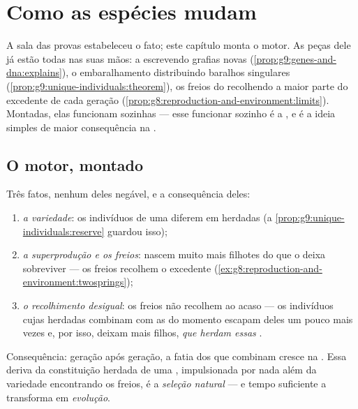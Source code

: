 \chapter{Como as espécies mudam}\label{ch:g9:how-species-change}

A sala das provas estabeleceu o fato; este capítulo monta o
motor. As peças dele já estão todas nas suas mãos: a 
escrevendo grafias novas
(\cref{prop:g9:genes-and-dna:explains}), o embaralhamento
distribuindo baralhos singulares
(\cref{prop:g9:unique-individuals:theorem}), os freios do
 recolhendo a maior parte do excedente de cada
geração
(\cref{prop:g8:reproduction-and-environment:limits}).
Montadas, elas funcionam sozinhas --- esse funcionar sozinho
é a , e é a ideia simples de maior
consequência na .

\section{O motor, montado}

\begin{proposition}\label{prop:g9:how-species-change:selection}
Três fatos, nenhum deles negável, e a consequência deles:
\begin{enumerate}
  \item \emph{a variedade}: os indivíduos de uma 
        diferem em  herdadas (a
        \cref{prop:g9:unique-individuals:reserve} guardou
        isso);
  \item \emph{a superprodução e os freios}: nascem muito mais
        filhotes do que o  deixa sobreviver --- os
        freios recolhem o excedente
        (\cref{ex:g8:reproduction-and-environment:twosprings});
  \item \emph{o recolhimento desigual}: os freios não
        recolhem ao acaso --- os indivíduos cujas
         herdadas combinam com as  do
        momento escapam deles um pouco mais vezes e, por
        isso, deixam mais filhos, \emph{que herdam essas
        }.
\end{enumerate}
Consequência: geração após geração, a fatia dos  que
combinam cresce na . Essa deriva da constituição
herdada de uma , impulsionada por nada além da
variedade encontrando os freios, é a \emph{seleção
natural} --- e tempo suficiente a
transforma em \emph{evolução}.
\end{proposition}
\admitted

